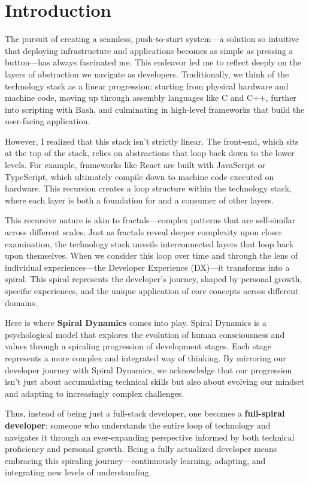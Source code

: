 \documentclass[../../main.tex]{subfiles}
\begin{document}
    \section{Introduction}

    The pursuit of creating a seamless, push-to-start system—a solution so intuitive that deploying infrastructure and applications becomes as simple as pressing a button—has always fascinated me. This endeavor led me to reflect deeply on the layers of abstraction we navigate as developers. Traditionally, we think of the technology stack as a linear progression: starting from physical hardware and machine code, moving up through assembly languages like C and C++, further into scripting with Bash, and culminating in high-level frameworks that build the user-facing application.

    However, I realized that this stack isn't strictly linear. The front-end, which sits at the top of the stack, relies on abstractions that loop back down to the lower levels. For example, frameworks like React are built with JavaScript or TypeScript, which ultimately compile down to machine code executed on hardware. This recursion creates a loop structure within the technology stack, where each layer is both a foundation for and a consumer of other layers.

    This recursive nature is akin to fractals—complex patterns that are self-similar across different scales. Just as fractals reveal deeper complexity upon closer examination, the technology stack unveils interconnected layers that loop back upon themselves. When we consider this loop over time and through the lens of individual experiences—the Developer Experience (DX)—it transforms into a spiral. This spiral represents the developer's journey, shaped by personal growth, specific experiences, and the unique application of core concepts across different domains.

    Here is where \textbf{Spiral Dynamics} comes into play. Spiral Dynamics is a psychological model that explores the evolution of human consciousness and values through a spiraling progression of development stages. Each stage represents a more complex and integrated way of thinking. By mirroring our developer journey with Spiral Dynamics, we acknowledge that our progression isn't just about accumulating technical skills but also about evolving our mindset and adapting to increasingly complex challenges.

    Thus, instead of being just a full-stack developer, one becomes a \textbf{full-spiral developer}: someone who understands the entire loop of technology and navigates it through an ever-expanding perspective informed by both technical proficiency and personal growth. Being a fully actualized developer means embracing this spiraling journey—continuously learning, adapting, and integrating new levels of understanding.

\end{document}
